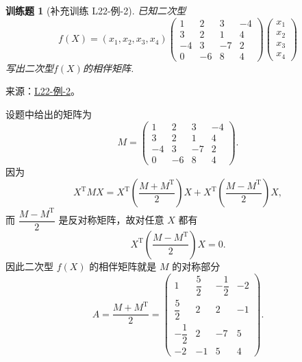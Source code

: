 \documentclass[UTF8,12pt,a4paper,fontset=fandol]{ctexart}
\newtheorem{exercise}{训练题}[section]
\begin{document}
\begin{exercise}[补充训练 L22-例-2]\label{prob:L22-例-2}
已知二次型
    \[f(X)=(x_1,x_2,x_3,x_4)\begin{pmatrix}
            1 & 2 & 3 & -4 \\ 3 & 2 & 1 & 4 \\ -4 & 3 & -7 & 2 \\ 0 & -6 & 8 & 4
        \end{pmatrix}\begin{pmatrix}
            x_1 \\ x_2 \\ x_3 \\ x_4
        \end{pmatrix}\]
    写出二次型$f(X)$的相伴矩阵.
\end{exercise}
\noindent 来源：\href{https://github.com/yhwu-is/Linear-Algebra-Left-Undone/blob/new/%E8%AE%B2%E4%B9%89/%E4%B8%93%E9%A2%98/22%20%E4%BA%8C%E6%AC%A1%E5%9E%8B.tex}{L22-例-2}。
\begin{solve}
设题中给出的矩阵为
    \[
        M=\begin{pmatrix}
            1 & 2 & 3 & -4 \\
            3 & 2 & 1 & 4 \\
            -4 & 3 & -7 & 2 \\
            0 & -6 & 8 & 4
        \end{pmatrix}.
    \]
    因为
    \[
        X^\mathrm{T}MX=X^\mathrm{T}\left(\frac{M+M^\mathrm{T}}{2}\right)X+X^\mathrm{T}\left(\frac{M-M^\mathrm{T}}{2}\right)X,
    \]
    而 $ \dfrac{M-M^\mathrm{T}}{2} $ 是反对称矩阵，故对任意 $X$ 都有
    \[
        X^\mathrm{T}\left(\frac{M-M^\mathrm{T}}{2}\right)X=0.
    \]
    因此二次型 $f(X)$ 的相伴矩阵就是 $M$ 的对称部分
    \[
        A=\frac{M+M^\mathrm{T}}{2}
        =\begin{pmatrix}
            1 & \dfrac{5}{2} & -\dfrac{1}{2} & -2 \\
            \dfrac{5}{2} & 2 & 2 & -1 \\
            -\dfrac{1}{2} & 2 & -7 & 5 \\
            -2 & -1 & 5 & 4
        \end{pmatrix}.
    \]
\end{solve}
\end{document}
